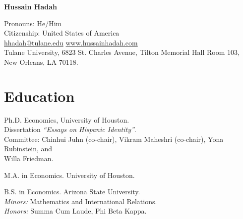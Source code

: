 \documentclass[letterpaper]{article}
\def\name{Hussain Hadah}
\renewenvironment{itemize}{
  \begin{list}{}{
    \setlength{\leftmargin}{1.5em}
  }
}{
  \end{list}
}
\begin{document}
\centerline{\huge \bf \name}

\begin{center}
   \hspace{0.5mm} Pronouns: He/Him \href{https://www.mypronouns.org/}{\faQuestionCircleO}  
\\    
\hspace{0.5mm} Citizenship: United States of America
\\
\faEnvelopeO \hspace{0.5mm} \href{mailto:hhadah@tulane.edu}{hhadah@tulane.edu} \rm  \hspace{0.5mm} \faGlobe \hspace{0.5mm} \href{https://www.hussainhadah.com/}{www.hussainhadah.com} 
\href{https://www.linkedin.com/in/hussain-hadah/}{\faLinkedinSquare} \href{https://github.com/hhadah}{\faGithub} 
\\ Tulane University, 6823 St. Charles Avenue, Tilton Memorial Hall Room 103, New Orleans, LA 70118.\\
  
\end{center}


\section*{Education}
\vspace{2 mm}
\begin{itemize}
  \item {}Ph.D. Economics, University of Houston. \\{\makebox[1.8cm]{\hfill}}Dissertation \textit{“Essays on Hispanic Identity”}. \\{\makebox[1.8cm]{\hfill}}Committee: Chinhui Juhn (co-chair), Vikram Maheshri (co-chair), Yona Rubinstein, and \\{\makebox[1.8cm]{\hfill}}Willa Friedman.
  \item {}M.A. in Economics. University of Houston. 
  \item {}B.S. in Economics.  Arizona State University. \\{\makebox[1.8cm]{\hfill}}\textit{Minors:} Mathematics and International Relations. \\{\makebox[1.8cm]{\hfill}}\textit{Honors:} Summa Cum Laude, Phi Beta Kappa.
\end{itemize}
\vspace{2 mm}
\end{document}
